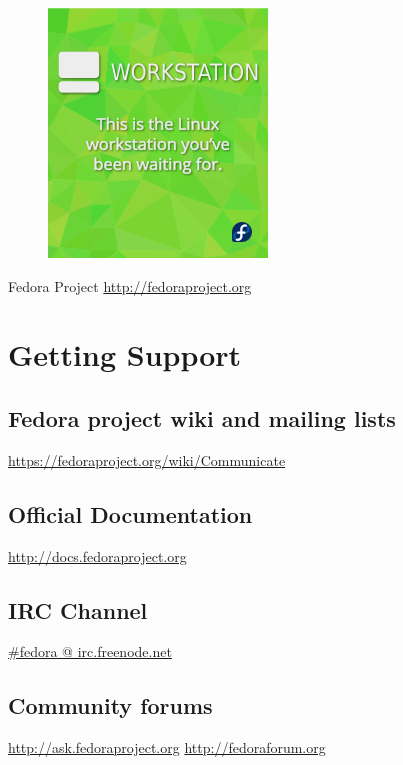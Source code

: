\documentclass[
letterpaper,
10pt
]{leaflet}
\begin{document}
\vspace{1.5cm}
\begin{figure}[h]
  \centering
  \includegraphics[keepaspectratio]{Fedora-workstation-v5a-infinity.png}
\end{figure}
\newpage

\begin{center}
  {\color{FedoraBlue}
  \LARGE{Fedora Project\vspace{1cm}}
  \Large{\href{http://fedoraproject.org}{http://fedoraproject.org}}
}
\end{center}

\section{\textcolor{FedoraBlue}{Getting Support}}
\subsection{Fedora project wiki and mailing lists}
\href{https://fedoraproject.org/wiki/Communicate}{https://fedoraproject.org/wiki/Communicate}

\subsection{Official Documentation}
\href{http://docs.fedoraproject.org}{http://docs.fedoraproject.org}

\subsection{IRC Channel}
\href{http://webchat.freenode.net/?channels=#fedora}{\#fedora @ irc.freenode.net}

\subsection{Community forums}
\href{http://ask.fedoraproject.org}{http://ask.fedoraproject.org}
\href{http://fedoraforum.org}{http://fedoraforum.org}
\end{document}
